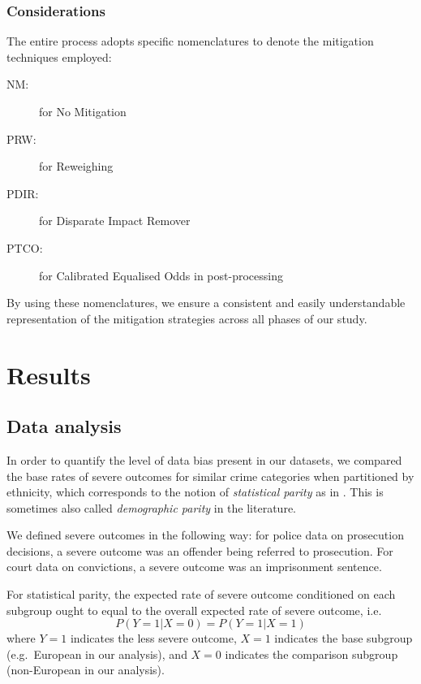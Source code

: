 \documentclass[runningheads]{llncs}
\begin{document}
\subsubsection{Considerations}

The entire process adopts specific nomenclatures to denote the
mitigation techniques employed:
\begin{description}
\item[NM:] for No Mitigation
\item[PRW:] for Reweighing
\item[PDIR:] for Disparate Impact Remover
\item[PTCO:] for Calibrated Equalised Odds in post-processing
\end{description}

By using these nomenclatures, we ensure a consistent and easily
understandable representation of the mitigation strategies across all
phases of our study.



\section{Results}
\label{sec:results}

\subsection{Data analysis}
\label{sec:data-analysis}
In order to quantify the level of data bias \cite{mehrabi2021survey}
present in our datasets, we compared the base rates of severe outcomes
for similar crime categories when partitioned by ethnicity, which
corresponds to the notion of \emph{statistical parity} as in
\cite{corbett2017algorithmic}. This is sometimes also called
\emph{demographic parity} in the literature.

We defined severe outcomes in the following way: for police data on
prosecution decisions, a severe outcome was an offender being referred
to prosecution. For court data on convictions, a severe outcome was an
imprisonment sentence.

For statistical parity, the expected rate of severe outcome
conditioned on each subgroup ought to equal to the overall expected
rate of severe outcome, i.e.
\begin{equation}
    \label{eq:parity}
    P(Y = 1 | X = 0) = P(Y = 1 | X = 1)
\end{equation}
where $Y = 1$ indicates the less severe outcome, $X = 1$ indicates the
base subgroup (e.g.\ European in our analysis), and $X = 0$ indicates
the comparison subgroup (non-European in our analysis).
\end{document}
